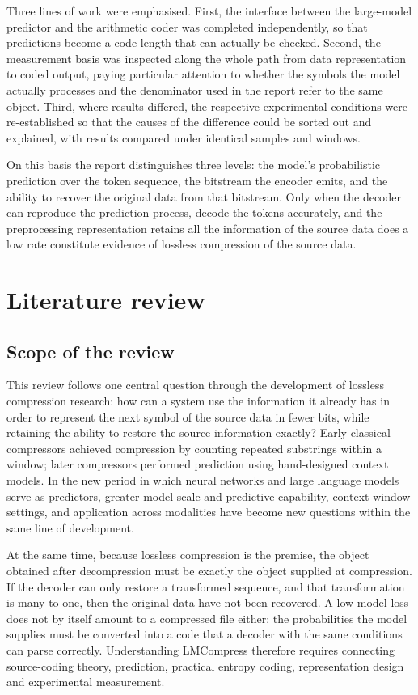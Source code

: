 \documentclass[12pt,a4paper]{article}
\begin{document}
Three lines of work were emphasised. First, the interface between the large-model predictor
and the arithmetic coder was completed independently, so that predictions become a code
length that can actually be checked. Second, the measurement basis was inspected along the
whole path from data representation to coded output, paying particular attention to whether
the symbols the model actually processes and the denominator used in the report refer to the
same object. Third, where results differed, the respective experimental conditions were
re-established so that the causes of the difference could be sorted out and explained, with
results compared under identical samples and windows.

On this basis the report distinguishes three levels: the model's probabilistic prediction
over the token sequence, the bitstream the encoder emits, and the ability to recover the
original data from that bitstream. Only when the decoder can reproduce the prediction
process, decode the tokens accurately, and the preprocessing representation retains all the
information of the source data does a low rate constitute evidence of lossless compression
of the source data.

\section{Literature review}

\subsection{Scope of the review}

This review follows one central question through the development of lossless compression
research: how can a system use the information it already has in order to represent the next
symbol of the source data in fewer bits, while retaining the ability to restore the source
information exactly? Early classical compressors achieved compression by counting repeated
substrings within a window; later compressors performed prediction using hand-designed
context models. In the new period in which neural networks and large language models serve
as predictors, greater model scale and predictive capability, context-window settings, and
application across modalities have become new questions within the same line of development.

At the same time, because lossless compression is the premise, the object obtained after
decompression must be exactly the object supplied at compression. If the decoder can only
restore a transformed sequence, and that transformation is many-to-one, then the original
data have not been recovered. A low model loss does not by itself amount to a compressed
file either: the probabilities the model supplies must be converted into a code that a
decoder with the same conditions can parse correctly. Understanding LMCompress therefore
requires connecting source-coding theory, prediction, practical entropy coding,
representation design and experimental measurement.
\end{document}
